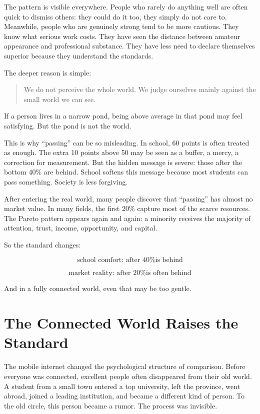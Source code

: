 The pattern is visible everywhere. People who rarely do anything well are often quick to dismiss others: they could do it too, they simply do not care to. Meanwhile, people who are genuinely strong tend to be more cautious. They know what serious work costs. They have seen the distance between amateur appearance and professional substance. They have less need to declare themselves superior because they understand the standards.

The deeper reason is simple:

\begin{quote}
We do not perceive the whole world. We judge ourselves mainly against the small world we can see.
\end{quote}

If a person lives in a narrow pond, being above average in that pond may feel satisfying. But the pond is not the world.

This is why ``passing'' can be so misleading. In school, 60 points is often treated as enough. The extra 10 points above 50 may be seen as a buffer, a mercy, a correction for measurement. But the hidden message is severe: those after the bottom 40\% are behind. School softens this message because most students can pass something. Society is less forgiving.

After entering the real world, many people discover that ``passing'' has almost no market value. In many fields, the first 20\% capture most of the scarce resources. The Pareto pattern appears again and again: a minority receives the majority of attention, trust, income, opportunity, and capital.

So the standard changes:

\[
\text{school comfort: after 40\% is behind}
\]

\[
\text{market reality: after 20\% is often behind}
\]

And in a fully connected world, even that may be too gentle.

\section*{The Connected World Raises the Standard}

The mobile internet changed the psychological structure of comparison. Before everyone was connected, excellent people often disappeared from their old world. A student from a small town entered a top university, left the province, went abroad, joined a leading institution, and became a different kind of person. To the old circle, this person became a rumor. The process was invisible.


